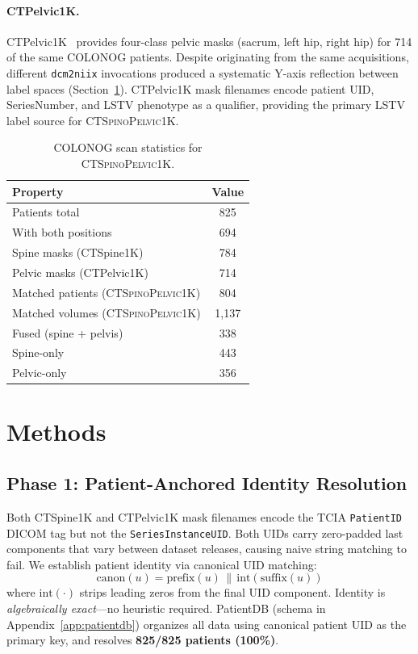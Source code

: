 \documentclass[pmlr]{jmlr}
\newcommand{\dataset}{\textsc{CTSpinoPelvic1K}}
\begin{document}
\paragraph{CTPelvic1K.}
CTPelvic1K~\citep{Liu2021DeepModels} provides four-class pelvic
masks (sacrum, left hip, right hip) for 714 of the same COLONOG
patients.
Despite originating from the same acquisitions, different
\texttt{dcm2niix} invocations produced a systematic Y-axis
reflection between label spaces (Section~\ref{sec:methods}).
CTPelvic1K mask filenames encode patient UID, SeriesNumber, and
LSTV phenotype as a qualifier, providing the primary LSTV label
source for \dataset{}.

\begin{table}[t]
  {\caption{COLONOG scan statistics for \dataset{}.}}
  {\small\begin{tabular}{lc}
  \toprule
  \bfseries Property & \bfseries Value \\
  \midrule
  Patients total                  & 825 \\
  \quad With both positions       & 694 \\
  Spine masks (CTSpine1K)         & 784 \\
  Pelvic masks (CTPelvic1K)       & 714 \\
  Matched patients (\dataset{})   & 804 \\
  Matched volumes (\dataset{})    & 1{,}137 \\
  \quad Fused (spine + pelvis)    & 338 \\
  \quad Spine-only                & 443 \\
  \quad Pelvic-only               & 356 \\
  \bottomrule
  \end{tabular}}
\end{table}

\section{Methods}
\label{sec:methods}

\subsection{Phase 1: Patient-Anchored Identity Resolution}
\label{sec:patientdb}

Both CTSpine1K and CTPelvic1K mask filenames encode the TCIA
\texttt{PatientID} DICOM tag but not the \texttt{SeriesInstanceUID}.
Both UIDs carry zero-padded last components that vary between
dataset releases, causing naive string matching to fail.
We establish patient identity via canonical UID matching:
\begin{equation}
\text{canon}(u) = \text{prefix}(u) \,\|\, \text{int}(\text{suffix}(u))
\label{eq:canon}
\end{equation}
where $\text{int}(\cdot)$ strips leading zeros from the final UID
component. Identity is \emph{algebraically exact}---no heuristic
required. PatientDB (schema in Appendix~\ref{app:patientdb})
organizes all data using canonical patient UID as the primary key,
and resolves \textbf{825/825 patients (100\%)}.
\end{document}
